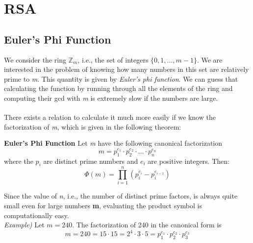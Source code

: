 \documentclass[11pt, a4paper]{article}
\newcommand{\mymod}{
    \text{ mod }
}
\begin{document}


\newpage
\section{RSA}
\subsection{Euler's Phi Function}
We consider the ring $\mathbb{Z}_m$, i.e., the set of integers $\{0,1,...,m-1\}$. We are interested in the problem of knowing how many numbers in this set are relatively prime to \textit{m}. This quantity is given by \textit{Euler's phi function}. We can guess that calculating the function by running through all the elements of the ring and computing their gcd with \textit{m} is extremely slow if the numbers are large.\\\\
There exists a relation to calculate it much more easily if we know the factorization of \textit{m}, which is given in the following theorem:
\begin{framed}
    \hfill\break\textbf{Euler's Phi Function} Let \textit{m} have the following canonical factorization
    $$m = p_1^{e_1}\cdot p_2^{e_2}\cdot\dotsc\cdot p_n^{e_n}$$
    where the $p_i$ are distinct prime numbers and $e_i$ are positive integers. Then:
    $$\Phi(m)=\prod^n_{i=1}(p_i^{e_i}-p_i^{e_{i-1}})$$
\end{framed}
Since the value of \textit{n}, i.e., the number of distinct prime factors, is always quite small even for large numbers \textbf{m}, evaluating the product symbol is computationally easy.\\

\textit{Example)} Let $m=240$. The factorization of 240 in the canonical form is
$$m=240=15\cdot15=2^4\cdot3\cdot5=p_1^{e_1}\cdot p_2^{e_2}\cdot p_3^{e_3}$$
\end{document}
